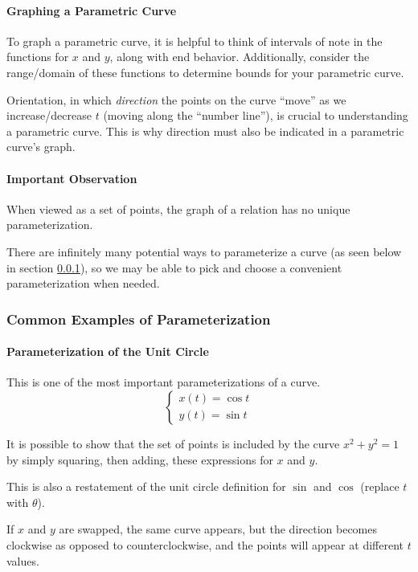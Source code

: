 \documentclass{article}
\begin{document}
\paragraph{Graphing a Parametric Curve}
To graph a parametric curve, it is helpful to think of intervals of note in the functions for $x$ and $y$, along with end behavior. Additionally, consider the range/domain of these functions to determine bounds for your parametric curve.

Orientation, in which \emph{direction} the points on the curve ``move'' as we increase/decrease $t$ (moving along the ``number line''), is crucial to understanding a parametric curve. This is why direction must also be indicated in a parametric curve's graph.

\paragraph{Important Observation}
When viewed as a set of points, the graph of a relation has no unique parameterization.

There are infinitely many potential ways to parameterize a curve (as seen below in section \ref{param-examples}), so we may be able to pick and choose a convenient parameterization when needed.

\subsubsection{Common Examples of Parameterization} \label{param-examples}
\paragraph{Parameterization of the Unit Circle}
This is one of the most important parameterizations of a curve.
\[
    \begin{cases}
        x(t) = \cos t \\
        y(t) = \sin t
    \end{cases}
\]

It is possible to show that the set of points is included by the curve $x^2 + y^2 = 1$ by simply squaring, then adding, these expressions for $x$ and $y$.

This is also a restatement of the unit circle definition for $\sin$ and $\cos$ (replace $t$ with $\theta$).

If $x$ and $y$ are swapped, the same curve appears, but the direction becomes clockwise as opposed to counterclockwise, and the points will appear at different $t$ values.
\end{document}

